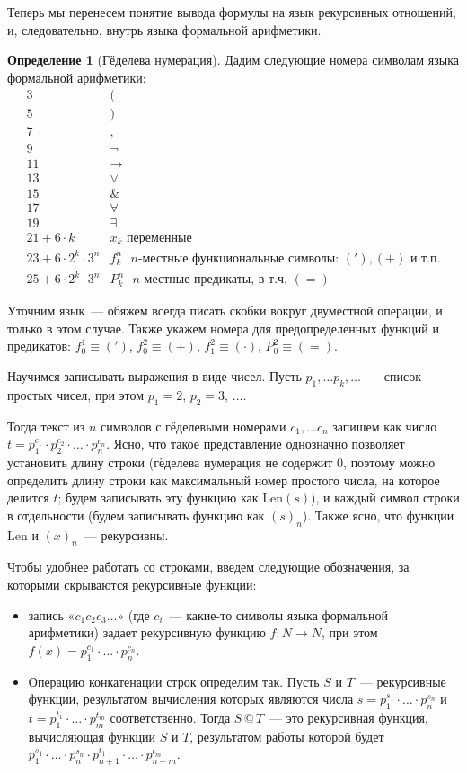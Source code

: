 \documentclass[a4paper,11pt]{article}
\theoremstyle{definition}
\newtheorem{dfn}[thm]{Определение}
\newcommand{\amp}{\mathbin{\&}}
\newcommand{\gn}[1]{\text{«}#1\text{»}}
\begin{document}
Теперь мы перенесем понятие вывода формулы на язык рекурсивных отношений, и,
следовательно, внутрь языка формальной арифметики.

\begin{dfn}[Гёделева нумерация]
Дадим следующие номера символам языка формальной арифметики:
\[
\begin{array}{rl}
3 & (\\
5 & )\\
7 & ,\\
9 & \neg\\
11 & \to\\
13 & \vee\\
15 & \amp\\
17 & \forall\\
19 & \exists\\
21 + 6 \cdot k & x_k \text{ переменные}\\
23 + 6 \cdot 2^k \cdot 3^n & f^n_k \text{ $n$-местные функциональные символы: } (') , (+) \text{ и т.п.}\\
25 + 6 \cdot 2^k \cdot 3^n & P^n_k \text{ $n$-местные предикаты, в т.ч. } (=)
\end{array}
\]
\end{dfn}

Уточним язык~--- обяжем всегда писать скобки вокруг двуместной операции, и
только в этом случае. Также укажем номера для предопределенных функций и
предикатов: $f^1_0 \equiv (')$, $f^2_0 \equiv (+)$, $f^2_1 \equiv (\cdot)$,
$P^2_0 \equiv (=)$.

Научимся записывать выражения в виде чисел. Пусть $p_1, \dots p_k, \dots$~---
список простых чисел, при этом $p_1 = 2$, $p_2 = 3$, $\dots$.

Тогда текст из $n$ символов с гёделевыми номерами $c_1, \dots c_n$ запишем как
число $t = p_1^{c_1} \cdot p_2^{c_2} \cdot \dots \cdot p_n^{c_n}$. Ясно, что
такое представление однозначно позволяет установить длину строки (гёделева
нумерация не содержит 0, поэтому можно определить длину строки как максимальный
номер простого числа, на которое делится $t$; будем записывать эту функцию как
$\mathrm{Len}(s)$), и каждый символ строки в отдельности (будем записывать
функцию как $(s)_n$). Также ясно, что функции $\mathrm{Len}$ и $(x)_n$~---
рекурсивны.

Чтобы удобнее работать со строками, введем следующие обозначения, за которыми
скрываются рекурсивные функции:
\begin{itemize}
\item запись $\gn{c_1 c_2 c_3 \dots}$ (где $c_i$~--- какие-то символы языка
  формальной арифметики) задает рекурсивную функцию $f : N \to N$, при этом
  $f(x) = p_1^{c_1} \cdot \dots \cdot p_n^{c_n}$.
\item Операцию конкатенации строк определим так. Пусть $S$ и $T$~--- рекурсивные
  функции, результатом вычисления которых являются числа $s = p_1^{s_1} \cdot
  \dots \cdot p_n^{s_n}$ и $t = p_1^{t_1} \cdot \dots \cdot p_m^{t_m}$
  соответственно. Тогда $S \mathbin{@} T$~--- это рекурсивная функция,
  вычисляющая функции $S$ и $T$, результатом работы которой будет $p_1^{s_1}
  \cdot \dots \cdot p_n^{s_n} \cdot p_{n+1}^{t_1} \cdot \dots \cdot
  p_{n+m}^{t_m}$.
\end{itemize}
\end{document}
